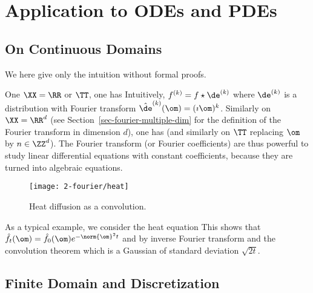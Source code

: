 \section{Application to ODEs and PDEs}
\label{sec-fourier-pdes}

\subsection{On Continuous Domains}

We here give only the intuition without formal proofs.

One $\XX=\RR$ or $\TT$, one has
Intuitively, $f^{(k)} = f \star \de^{(k)}$ where $\de^{(k)}$ is a distribution with Fourier transform $\hat \de^{(k)}(\om) = (\imath \om)^k$. 
%
Similarly on $\XX=\RR^d$ (see Section~\ref{sec-fourier-multiple-dim} for the definition of the Fourier transform in dimension $d$), one has
(and similarly on $\TT$ replacing $\om$ by $n \in \ZZ^d$).
%
The Fourier transform (or Fourier coefficients) are thus powerful to study linear differential equations with constant coefficients, because they are turned into algebraic equations.

\begin{figure}
\centering
\texttt{[image: 2-fourier/heat]}
\caption{\label{fig-heat}
Heat diffusion as a convolution.
}
\end{figure}

As a typical example, we consider the heat equation
This shows that $\hat f_t(\om) = \hat f_0(\om) e^{-\norm{\om}^2 t}$ and by inverse Fourier transform and the convolution theorem
which is a Gaussian of standard deviation $\sqrt{2t}$.


\subsection{Finite Domain and Discretization}

